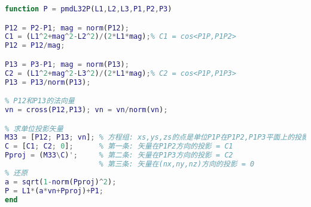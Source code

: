
\begin{issues}
\issueDraft
\end{issues}


\begin{lstlisting}[language=matlab]
% 已知三棱锥地面的三个点坐标 P1,P2,P3, 和三条棱 L1,L2,L3, 求顶点坐标
function P = pmdL32P(L1,L2,L3,P1,P2,P3)

P12 = P2-P1; mag = norm(P12);
C1 = (L1^2+mag^2-L2^2)/(2*L1*mag);% C1 = cos<P1P,P1P2>
P12 = P12/mag;

P13 = P3-P1; mag = norm(P13);
C2 = (L1^2+mag^2-L3^2)/(2*L1*mag);% C2 = cos<P1P,P1P3>
P13 = P13/norm(P13);

% P12和P13的法向量
vn = cross(P12,P13); vn = vn/norm(vn);

% 求单位投影矢量
M33 = [P12; P13; vn]; % 方程组: xs,ys,zs的点是单位P1P在P1P2,P1P3平面上的投影矢量(单位矢量)
C = [C1; C2; 0];      % 第一条: 矢量在P1P2方向的投影 = C1
Pproj = (M33\C)';     % 第二条: 矢量在P1P3方向的投影 = C2
                      % 第三条: 矢量在(nx,ny,nz)方向的投影 = 0
% 还原
a = sqrt(1-norm(Pproj)^2);
P = L1*(a*vn+Pproj)+P1;
end
\end{lstlisting}

